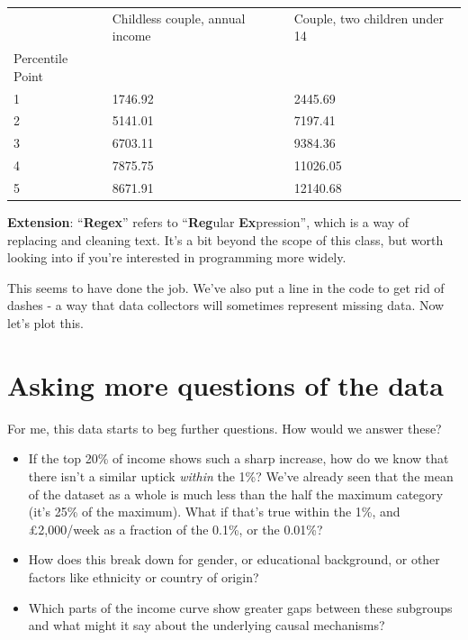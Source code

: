\documentclass[
  letterpaper,
  DIV=11,
  numbers=noendperiod]{scrreprt}
\begin{document}
\begin{longtable}[]{@{}lll@{}}
\toprule()
& Childless couple, annual income & Couple, two children under 14 \\
Percentile Point & & \\
\midrule()
\endhead
1 & 1746.92 & 2445.69 \\
2 & 5141.01 & 7197.41 \\
3 & 6703.11 & 9384.36 \\
4 & 7875.75 & 11026.05 \\
5 & 8671.91 & 12140.68 \\
\bottomrule()
\end{longtable}

\textbf{Extension}: ``\textbf{Regex}'' refers to ``\textbf{Reg}ular
\textbf{Ex}pression'', which is a way of replacing and cleaning text.
It's a bit beyond the scope of this class, but worth looking into if
you're interested in programming more widely.

This seems to have done the job. We've also put a line in the code to
get rid of dashes - a way that data collectors will sometimes represent
missing data. Now let's plot this.

\hypertarget{asking-more-questions-of-the-data}{%
\section{Asking more questions of the
data}\label{asking-more-questions-of-the-data}}

For me, this data starts to beg further questions. How would we answer
these?

\begin{itemize}
\item
  If the top 20\% of income shows such a sharp increase, how do we know
  that there isn't a similar uptick \emph{within} the 1\%? We've already
  seen that the mean of the dataset as a whole is much less than the
  half the maximum category (it's 25\% of the maximum). What if that's
  true within the 1\%, and £2,000/week as a fraction of the 0.1\%, or
  the 0.01\%?
\item
  How does this break down for gender, or educational background, or
  other factors like ethnicity or country of origin?
\item
  Which parts of the income curve show greater gaps between these
  subgroups and what might it say about the underlying causal
  mechanisms?
\end{itemize}
\end{document}
